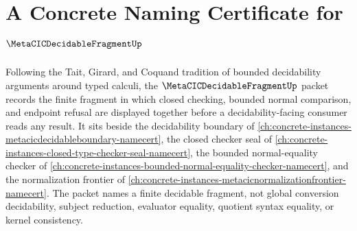 \chapter{A Concrete Naming Certificate for $\MetaCICDecidableFragmentUp$}
\label{ch:concrete-instances-metacic-decidable-fragment-namecert}

Following the Tait, Girard, and Coquand tradition of bounded decidability arguments around typed calculi, the $\MetaCICDecidableFragmentUp$ packet records the finite fragment in which closed checking, bounded normal comparison, and endpoint refusal are displayed together before a decidability-facing consumer reads any result. It sits beside the decidability boundary of \autoref{ch:concrete-instances-metacicdecidableboundary-namecert}, the closed checker seal of \autoref{ch:concrete-instances-closed-type-checker-seal-namecert}, the bounded normal-equality checker of \autoref{ch:concrete-instances-bounded-normal-equality-checker-namecert}, and the normalization frontier of \autoref{ch:concrete-instances-metacicnormalizationfrontier-namecert}. The packet names a finite decidable fragment, not global conversion decidability, subject reduction, evaluator equality, quotient syntax equality, or kernel consistency.


